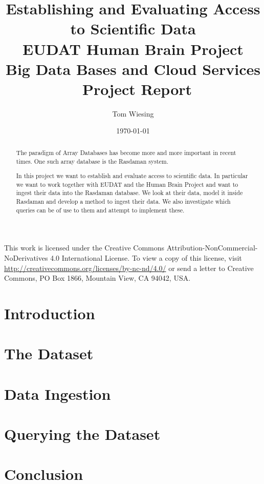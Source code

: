 \documentclass{article}
\title{Establishing and Evaluating Access to Scientific Data \\EUDAT Human Brain Project \\ Big Data Bases and Cloud Services \\ Project Report}
\author{Tom Wiesing}
\date{\today}
\begin{document}
	\maketitle

	\begin{abstract}
		The paradigm of Array Databases has become more and more important in recent times. One such array database is the Rasdaman system.

		In this project we want to establish and evaluate access to scientific data. In particular we want to work together with EUDAT and the Human Brain Project and want to ingest their data into the Rasdaman database. We look at their data, model it inside Rasdaman and develop a method to ingest their data. We also investigate which queries can be of use to them and attempt to implement these. 
	\end{abstract}

	\newpage

	\tableofcontents


	\vspace{\fill}\noindent
	This work is licensed under the Creative Commons Attribution-NonCommercial-NoDerivatives 4.0 International License. To view a copy of this license, visit \url{http://creativecommons.org/licenses/by-nc-nd/4.0/} or send a letter to Creative Commons, PO Box 1866, Mountain View, CA 94042, USA.
	\newpage

	\section{Introduction}
	
	\newpage

	\section{The Dataset}
	
	\newpage

	\section{Data Ingestion}
	
	\newpage

	\section{Querying the Dataset}
	
	\newpage

	\section{Conclusion}
	

	\printbibliography
\end{document}
